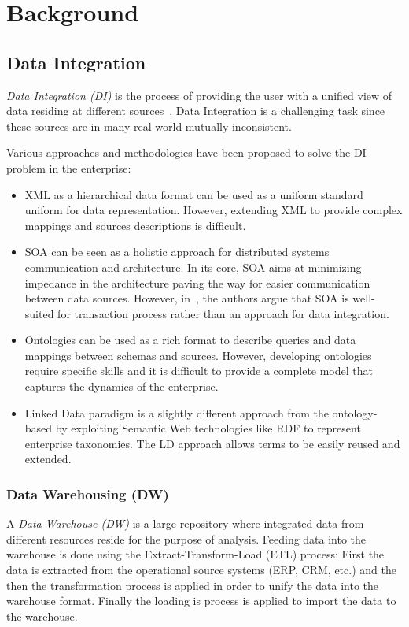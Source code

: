\chapter{Background} \label{chapter:part2-background}
\graphicspath{{Part2/Background/figures/}}

\section{Data Integration}\label{section:dataIntegration}

\textit{Data Integration (DI)} is the process of providing the user with a unified view of data residing at different sources~\cite{Lenzerini:DIT:02}. Data Integration is a challenging task since these sources are in many real-world mutually inconsistent.

Various approaches and methodologies have been proposed to solve the DI problem in the enterprise:
\begin{itemize}
	\item XML as a hierarchical data format can be used as a uniform standard uniform for data representation. However, extending XML to provide complex mappings and sources descriptions is difficult.
	\item SOA can be seen as a holistic approach for distributed systems communication and architecture. In its core, SOA aims at minimizing impedance in the architecture paving the way for easier communication between data sources. However, in~\cite{Frischmuth:ISWC:13}, the authors argue that SOA is well-suited for transaction process rather than an approach for data integration.
	\item Ontologies can be used as a rich format to describe queries and data mappings between schemas and sources. However, developing ontologies require specific skills and it is difficult to provide a complete model that captures the dynamics of the enterprise.
	\item Linked Data paradigm is a slightly different approach from the ontology-based by exploiting Semantic Web technologies like RDF to represent enterprise taxonomies. The LD approach allows terms to be easily reused and extended.
\end{itemize}

\subsection{Data Warehousing (DW)}

A \textit{Data Warehouse (DW)} is a large repository where integrated data from different resources reside for the purpose of analysis. Feeding data into the warehouse is done using the Extract-Transform-Load (ETL) process: First the data is extracted from the operational source systems (ERP, CRM, etc.) and the then the transformation process is applied in order to unify the data into the warehouse format. Finally the loading is process is applied to import the data to the warehouse.

